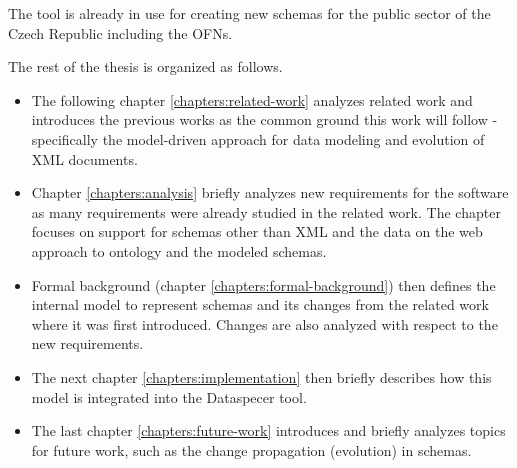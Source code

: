 The tool is already in use for creating new schemas for the public sector of the Czech Republic including the OFNs.

\bigskip

\noindent The rest of the thesis is organized as follows.

\begin{itemize}
    \item The following chapter \ref{chapters:related-work} analyzes related work and introduces the previous works as the common ground this work will follow - specifically the model-driven approach for data modeling and evolution of XML documents.
    \item Chapter \ref{chapters:analysis} briefly analyzes new requirements for the software as many requirements were already studied in the related work. The chapter focuses on support for schemas other than XML and the data on the web \cite{data-on-the-web} approach to ontology and the modeled schemas.
    \item Formal background (chapter \ref{chapters:formal-background}) then defines the internal model to represent schemas and its changes from the related work where it was first introduced. Changes are also analyzed with respect to the new requirements.
    \item The next chapter \ref{chapters:implementation} then briefly describes how this model is integrated into the Dataspecer tool.
    \item The last chapter \ref{chapters:future-work} introduces and briefly analyzes topics for future work, such as the change propagation (evolution) in schemas.
\end{itemize}

